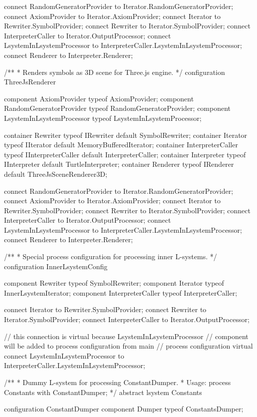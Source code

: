 \begin{LsystemBreak}
{	connect RandomGeneratorProvider
		to Iterator.RandomGeneratorProvider;
	connect AxiomProvider to Iterator.AxiomProvider;
	connect Iterator to Rewriter.SymbolProvider;
	connect Rewriter to Iterator.SymbolProvider;
	connect InterpreterCaller to Iterator.OutputProcessor;
	connect LsystemInLsystemProcessor
		to InterpreterCaller.LsystemInLsystemProcessor;
	connect Renderer to Interpreter.Renderer;
}

/**
 * Renders symbols as 3D scene for Three.js engine.
 */
configuration ThreeJsRenderer {
	component AxiomProvider typeof AxiomProvider;
	component RandomGeneratorProvider
		typeof RandomGeneratorProvider;
	component LsystemInLsystemProcessor
		typeof LsystemInLsystemProcessor;

	container Rewriter typeof IRewriter default SymbolRewriter;
	container Iterator typeof IIterator
		default MemoryBufferedIterator;
	container InterpreterCaller typeof IInterpreterCaller
		default InterpreterCaller;
	container Interpreter typeof IInterpreter
		default TurtleInterpreter;
	container Renderer typeof IRenderer
		default ThreeJsSceneRenderer3D;

	connect RandomGeneratorProvider
		to Iterator.RandomGeneratorProvider;
	connect AxiomProvider to Iterator.AxiomProvider;
	connect Iterator to Rewriter.SymbolProvider;
	connect Rewriter to Iterator.SymbolProvider;
	connect InterpreterCaller to Iterator.OutputProcessor;
	connect LsystemInLsystemProcessor
		to InterpreterCaller.LsystemInLsystemProcessor;
	connect Renderer to Interpreter.Renderer;
}

/**
 * Special process configuration for processing inner L-systems.
 */
configuration InnerLsystemConfig {
	component Rewriter typeof SymbolRewriter;
	component Iterator typeof InnerLsystemIterator;
	component InterpreterCaller typeof InterpreterCaller;

	connect Iterator to Rewriter.SymbolProvider;
	connect Rewriter to Iterator.SymbolProvider;
	connect InterpreterCaller to Iterator.OutputProcessor;

	// this connection is virtual because LsystemInLsystemProcessor
	// component will be added to process configuration from main
	// process configuration
	virtual connect LsystemInLsystemProcessor
		to InterpreterCaller.LsystemInLsystemProcessor;
}

/**
 * Dummy L-system for processing ConstantDumper.
 * Usage: process Constants with ConstantDumper;
 */
abstract lsystem Constants { }

configuration ConstantDumper {
	component Dumper typeof ConstantsDumper;
}
\end{LsystemBreak}



